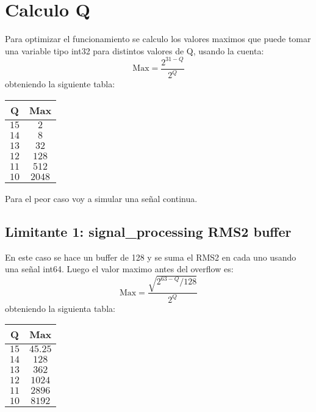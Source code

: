 \documentclass[../main.tex]{subfiles}
\begin{document}
\section{Calculo Q}
Para optimizar el funcionamiento se calculo los valores maximos que puede tomar una variable tipo int32 para distintos valores de Q, usando la cuenta:
\[
    \text{Max} = \frac{2^{31 - Q}}{2^Q}
\]
obteniendo la siguiente tabla:

\begin{table}[!hbtp]
    \centering
    \begin{tabular}{@{}cc@{}}
    \toprule
    Q  & Max  \\ \midrule
    $15$ & $2$    \\
    $14$ & $8$    \\
    $13$ & $32$   \\
    $12$ & $128$  \\
    $11$ & $512$  \\
    $10$ & $2048$ \\ \bottomrule
    \end{tabular}
\end{table}

Para el peor caso voy a simular una señal continua.

\subsection{Limitante 1: signal\_processing RMS2 buffer}
En este caso se hace un buffer de 128 y se suma el RMS2 en cada uno usando una señal int64. Luego el valor maximo antes del overflow es:
\[
    \text{Max} = \frac{\sqrt{2^{63 - Q} / 128}}{2^Q}
\]
obteniendo la siguienta tabla:

\begin{table}[!hbtp]
    \centering
    \begin{tabular}{@{}cc@{}}
    \toprule
    Q  & Max  \\ \midrule
    $15$ & $45.25$ \\
    $14$ & $128$   \\
    $13$ & $362$   \\
    $12$ & $1024$  \\
    $11$ & $2896$  \\
    $10$ & $8192$  \\ \bottomrule
    \end{tabular}
\end{table}
\end{document}
